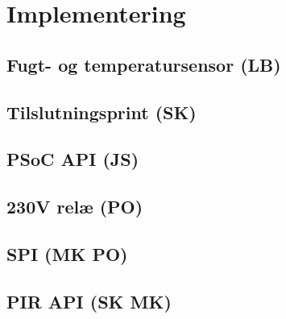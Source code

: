 \chapter{Implementering}


\section{Fugt- og temperatursensor (LB)}


\section{Tilslutningsprint (SK)}


\section{PSoC API (JS)}


\section{230V relæ (PO)}


\newpage
\section{SPI (MK PO)}


\section{PIR API (SK MK)}




